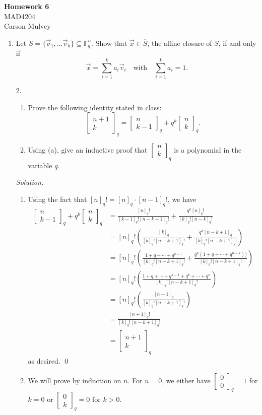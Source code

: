 \documentclass[11pt,letterpaper,dvipsnames]{article}
\newcommand{\qbin}[2]{\begin{bmatrix}{#1}\\ {#2}\end{bmatrix}_q}
\newcommand{\qf}[1]{[#1]_q!}
\newenvironment{solution}{\color{Violet}\textit{Solution.}}{\color{black}}
\begin{document}

\flushleft

\begin{center}
    \begin{large}
        \textbf{Homework 6} \\
        MAD4204 \\ 
        Carson Mulvey
    \end{large}
\end{center}

\pagestyle{empty}


\begin{enumerate}

\item Let $S = \{\vec{v}_1,\dots \vec{v}_k\} \subseteq \mathbb{F}_q^n$.
Show that $\vec{x} \in \overline{S}$, the affine closure of $S$, if and only if
\[
\vec{x} = \sum_{i=1}^k a_i \vec{v}_i \quad \mbox{with} \quad \sum_{i=1}^k a_i = 1.
\]

\item[2.] \begin{enumerate}
\item Prove the following identity stated in class:
\[
\qbin{n+1}{k} = \qbin{n}{k-1} + q^k \qbin{n}{k}.
\]

\item Using (a), give an inductive proof that $\qbin{n}{k}$ is a polynomial in the variable $q$.
 \end{enumerate}
\begin{solution}
	\begin{enumerate}
		\item Using the fact that $\qf{n}=[n]_q\cdot\qf{n-1}$, we have
		\begin{align*}
			\qbin{n}{k-1} + q^k \qbin{n}{k} &= \frac{\qf{n}}{\qf{k-1}\qf{n-k+1}} + \frac{q^k\qf{n}}{\qf{k}\qf{n-k}} \\
			&= \qf{n} \left( \frac{[k]_q}{\qf{k}\qf{n-k+1}} + \frac{q^k[n-k+1]_q}{\qf{k}\qf{n-k+1}} \right) \\
			&= \qf{n} \left( \frac{1+q+\cdots+q^{k-1}}{\qf{k}\qf{n-k+1}} + \frac{q^k(1+q+\cdots+q^{n-k}))}{\qf{k}\qf{n-k+1}} \right) \\
			&= \qf{n} \left( \frac{1+q+\cdots+q^{k-1}+q^k+\cdots+q^n}{\qf{k}\qf{n-k+1}} \right) \\
			&= \qf{n} \left( \frac{[n+1]_q}{\qf{k}\qf{n-k+1}} \right) \\
			&= \frac{\qf{n+1}}{\qf{k}\qf{n-k+1}} \\
			&= \qbin{n+1}{k}
		\end{align*}
		as desired. \qed
		\item We will prove by induction on $n$. For $n=0$, we either have $\qbin{0}{0}=1$ for $k=0$ or $\qbin{0}{k}=0$ for $k>0$.
		

\end{enumerate}
\end{solution}
\end{enumerate}
\end{document}
